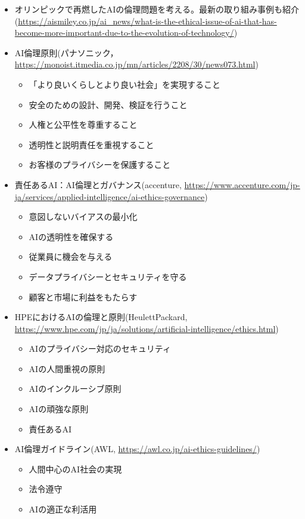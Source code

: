 \begin{itemize}
\begin{itemize}
	\end{itemize}
	\item オリンピックで再燃したAIの倫理問題を考える。最新の取り組み事例も紹介 (\url{https://aismiley.co.jp/ai_news/what-is-the-ethical-issue-of-ai-that-has-become-more-important-due-to-the-evolution-of-technology/})
	\item AI倫理原則(パナソニック，\url{https://monoist.itmedia.co.jp/mn/articles/2208/30/news073.html})
	\begin{itemize}
		\item 「より良いくらしとより良い社会」を実現すること
		\item 安全のための設計、開発、検証を行うこと
		\item 人権と公平性を尊重すること
		\item 透明性と説明責任を重視すること
		\item お客様のプライバシーを保護すること
	\end{itemize}
	\item 責任あるAI：AI倫理とガバナンス(accenture, \url{https://www.accenture.com/jp-ja/services/applied-intelligence/ai-ethics-governance})
	\begin{itemize}
		\item 意図しないバイアスの最小化
		\item AIの透明性を確保する
		\item 従業員に機会を与える
		\item データプライバシーとセキュリティを守る
		\item 顧客と市場に利益をもたらす
	\end{itemize}
	\item HPEにおけるAIの倫理と原則(HeulettPackard, \url{https://www.hpe.com/jp/ja/solutions/artificial-intelligence/ethics.html})
	\begin{itemize}
		\item AIのプライバシー対応のセキュリティ
		\item AIの人間重視の原則
		\item AIのインクルーシブ原則
		\item AIの頑強な原則
		\item 責任あるAI
	\end{itemize}
	\item AI倫理ガイドライン(AWL, \url{https://awl.co.jp/ai-ethics-guidelines/})
	\begin{itemize}
		\item 人間中心のAI社会の実現
		\item 法令遵守
		\item AIの適正な利活用

\end{itemize}
\end{itemize}
